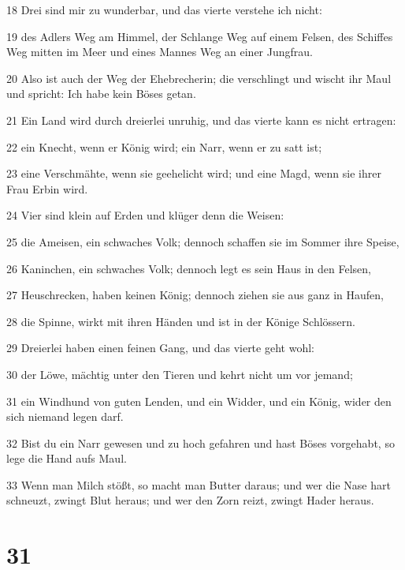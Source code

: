 \par 18 Drei sind mir zu wunderbar, und das vierte verstehe ich nicht:
\par 19 des Adlers Weg am Himmel, der Schlange Weg auf einem Felsen, des Schiffes Weg mitten im Meer und eines Mannes Weg an einer Jungfrau.
\par 20 Also ist auch der Weg der Ehebrecherin; die verschlingt und wischt ihr Maul und spricht: Ich habe kein Böses getan.
\par 21 Ein Land wird durch dreierlei unruhig, und das vierte kann es nicht ertragen:
\par 22 ein Knecht, wenn er König wird; ein Narr, wenn er zu satt ist;
\par 23 eine Verschmähte, wenn sie geehelicht wird; und eine Magd, wenn sie ihrer Frau Erbin wird.
\par 24 Vier sind klein auf Erden und klüger denn die Weisen:
\par 25 die Ameisen, ein schwaches Volk; dennoch schaffen sie im Sommer ihre Speise,
\par 26 Kaninchen, ein schwaches Volk; dennoch legt es sein Haus in den Felsen,
\par 27 Heuschrecken, haben keinen König; dennoch ziehen sie aus ganz in Haufen,
\par 28 die Spinne, wirkt mit ihren Händen und ist in der Könige Schlössern.
\par 29 Dreierlei haben einen feinen Gang, und das vierte geht wohl:
\par 30 der Löwe, mächtig unter den Tieren und kehrt nicht um vor jemand;
\par 31 ein Windhund von guten Lenden, und ein Widder, und ein König, wider den sich niemand legen darf.
\par 32 Bist du ein Narr gewesen und zu hoch gefahren und hast Böses vorgehabt, so lege die Hand aufs Maul.
\par 33 Wenn man Milch stößt, so macht man Butter daraus; und wer die Nase hart schneuzt, zwingt Blut heraus; und wer den Zorn reizt, zwingt Hader heraus.

\chapter{31}

